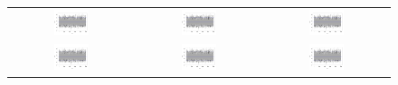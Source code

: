 \begin{figure}
\centering
\begin{tabular}{ccc}
%
  \includegraphics[page=1,width=0.3\textwidth]{figures/cal_trace.png} &
  \includegraphics[page=2,width=0.3\textwidth]{figures/cal_trace.png} &
  \includegraphics[page=3,width=0.3\textwidth]{figures/cal_trace.png} \\
  \includegraphics[page=4,width=0.3\textwidth]{figures/cal_trace.png} &
  \includegraphics[page=5,width=0.3\textwidth]{figures/cal_trace.png} &
  \includegraphics[page=6,width=0.3\textwidth]{figures/cal_trace.png} \\

\end{tabular}
\end{figure}
